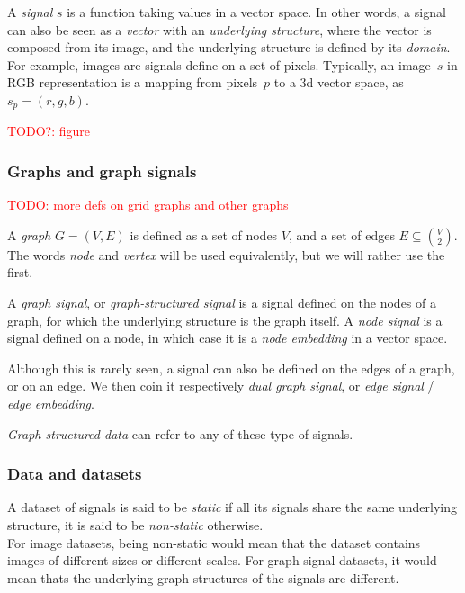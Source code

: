A \emph{signal} $s$ is a function taking values in a vector space. In other words, a signal can also be seen as a \emph{vector} with an \emph{underlying structure}, where the vector is composed from its image, and the underlying structure is defined by its \emph{domain}.\\

For example, images are signals define on a set of pixels. Typically, an image~$s$ in RGB representation is a mapping from pixels~$p$ to a 3d vector space, as $s_p = (r,g,b)$.

\textcolor{red}{TODO?: figure}
\begin{figure}

\end{figure}

\subsubsection{Graphs and graph signals}

%
\textcolor{red}{TODO: more defs on grid graphs and other graphs}
%

A \emph{graph} $G = (V, E)$ is defined as a set of nodes $V$, and a set of edges $E \subseteq\binom{V}{2}$. The words \emph{node} and \emph{vertex} will be used equivalently, but we will rather use the first.

A \emph{graph signal}, or \emph{graph-structured signal} is a signal defined on the nodes of a graph, for which the underlying structure is the graph itself.
A \emph{node signal} is a signal defined on a node, in which case it is a \emph{node embedding} in a vector space.

Although this is rarely seen, a signal can also be defined on the edges of a graph, or on an edge. We then coin it respectively \emph{dual graph signal}, or \emph{edge signal} / \emph{edge embedding}.

\emph{Graph-structured data} can refer to any of these type of signals.

\subsubsection{Data and datasets}

A dataset of signals is said to be \emph{static} if all its signals share the same underlying structure, it is said to be \emph{non-static} otherwise.\\
For image datasets, being non-static would mean that the dataset contains images of different sizes or different scales. For graph signal datasets, it would mean thats the underlying graph structures of the signals are different.

